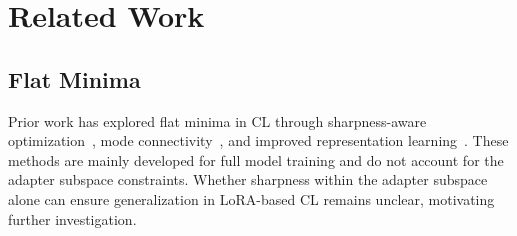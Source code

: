 \documentclass{article}
\theoremstyle{plain}
\theoremstyle{definition}
\theoremstyle{remark}
\begin{document}







\section{Related Work}


\subsection{Flat Minima}
Prior work has explored flat minima in CL through sharpness-aware optimization~\cite{pmlr-v151-bisla22a,foretSharpnessAwareMinimizationEfficiently2021,zhangGradientNormAware2023}, mode connectivity~\cite{izmailov2019averagingweightsleadswider,mirzadeh2020linearmodeconnectivitymultitask}, and improved representation learning~\cite{hu2022doesselfsupervisedpretrainingperform,ramasesh2022effect}.
These methods are mainly developed for full model training and do not account for the adapter subspace constraints\cite{yangRevisitingFlatnessAwareOptimization2025}. Whether sharpness within the adapter subspace alone can ensure generalization in LoRA-based CL remains unclear, motivating further investigation.


\end{document}

